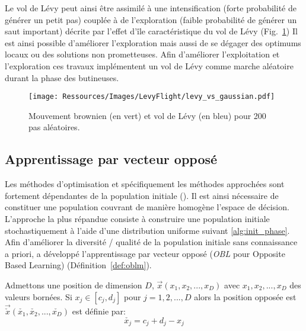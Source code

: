 Le vol de Lévy peut ainsi être assimilé à une intensification (forte probabilité de générer un petit pas)
couplée à de l’exploration (faible probabilité de générer un saut important) décrite par
l’effet d’île caractéristique du vol de Lévy (Fig.~\ref{fig:levy_vs_gaussian})
Il est ainsi possible d’améliorer l’exploration mais aussi de se dégager des optimums
locaux ou des solutions non prometteuses. Afin d’améliorer l’exploitation et l’exploration
ces travaux implémentent un vol de Lévy comme marche aléatoire durant la phase des butineuses.

\begin{figure}
    \begin{center}
        \texttt{[image: Ressources/Images/LevyFlight/levy\_vs\_gaussian.pdf]}
    \end{center}
    \caption{Mouvement brownien (en vert) et vol de Lévy (en bleu) pour 200 pas aléatoires.
             \label{fig:levy_vs_gaussian}}
\end{figure}


\subsection{Apprentissage par vecteur opposé} %
\label{sub:apprentissage_par_vecteur_oppose}
Les méthodes d’optimisation et spécifiquement les méthodes approchées sont fortement
dépendantes de la population initiale (). Il est ainsi nécessaire
de constituer une population couvrant de manière homogène l’espace de décision.
L’approche la plus répandue consiste à construire une population initiale stochastiquement
à l’aide d’une distribution uniforme suivant \eqref{alg:init_phase}.
Afin d’améliorer la diversité / qualité de la population initiale sans connaissance
a priori, \textcite{Tizhoosh2005695} a développé l’apprentissage par vecteur opposé
(\textit{OBL} pour Opposite Based Learning) (Définition~\ref{def:oblm}).

\begin{Def}\label{def:oblm}
Admettons une position de dimension $D$, $\vec{x}(x_{1}, x_{2}, ..., x_{D})$ avec
$x_{1}, x_{2}, ..., x_{D}$ des valeurs bornées. Si $x_{j} \in [c_{j}, d_{j}]$ pour
$j = 1, 2, ..., D$ alors la position opposée est $\vec{\check{x}}(\check{x_{1}},%
\check{x_{2}}, ..., \check{x_{D}})$ est définie par:
\[\check{x_{j}} = c_{j} + d_{j} - x_{j}\]
\end{Def}


